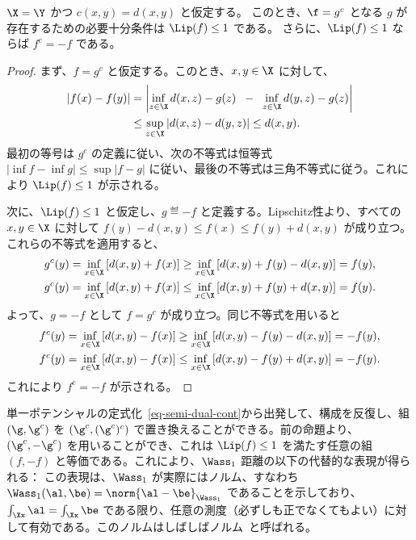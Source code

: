 \begin{prop}$\X=\Y$ かつ $c(x,y)=d(x,y)$ と仮定する。
このとき、$\f = g^c$ となる $g$ が存在するための必要十分条件は $\Lip(f) \leq 1$ である。
さらに、$\Lip(f)\leq1$ ならば $f^c=-f$ である。
\end{prop}

\begin{proof}
まず、$f=g^c$ と仮定する。このとき、$x,y\in \X$ に対して、
\begin{align*}
|f(x)-f(y)|&=\left|\inf_{z\in\X} d(x,z)-g(z) \;\; - \;\;\inf_{z\in \X} d(y,z)-g(z) \right|\\
&\leq \sup_{z\in\X} |d(x,z)-d(y,z)|\leq d(x,y).
\end{align*}
最初の等号は $g^c$ の定義に従い、次の不等式は恒等式 $|\inf f-\inf g|\leq\sup|f-g|$ に従い、最後の不等式は三角不等式に従う。これにより $\Lip(f)\leq1$ が示される。

次に、$\Lip(f)\leq1$ と仮定し、$g\eqdef -f$ と定義する。Lipschitz性より、すべての $x,y\in\X$ に対して
$f(y)-d(x,y)\leq f(x)\leq f(y)+d(x,y)$ が成り立つ。
これらの不等式を適用すると、
\begin{align*}
g^c(y)&=\inf_{x\in\X}\left[ d(x,y) + f(x) \right]
\geq\inf_{x\in \X} \left[  d(x,y)+f(y)-d(x,y)\right]=f(y),\\
g^c(y)&=\inf_{x\in\X}\left[ d(x,y) + f(x) \right]
\leq \inf_{x\in\X}\left[ d(x,y) + f(y)+d(x,y) \right]=f(y).
\end{align*}
よって、$g=-f$ として $f=g^c$ が成り立つ。同じ不等式を用いると
\begin{align*}
f^c(y)&=\inf_{x\in\X}\left[ d(x,y) - f(x) \right]
\geq\inf_{x\in \X} \left[  d(x,y)-f(y)-d(x,y)\right]=-f(y),\\
f^c(y)&=\inf_{x\in\X}\left[ d(x,y) - f(x) \right]
\leq \inf_{x\in\X}\left[ d(x,y) - f(y)+d(x,y) \right]=-f(y).
\end{align*}
これにより $f^c=-f$ が示される。
\end{proof}

単一ポテンシャルの定式化~\eqref{eq-semi-dual-cont}から出発して、構成を反復し、組 $(\g,\g^c)$ を $(\g^c,(\g^c)^c)$ で置き換えることができる。前の命題より、$(\g^c,-\g^c)$ を用いることができ、これは $\Lip(f) \leq 1$ を満たす任意の組 $(f,-f)$ と等価である。これにより、$\Wass_1$ 距離の以下の代替的な表現が得られる：
この表現は、$\Wass_1$ が実際にはノルム、すなわち $\Wass_1(\al,\be) = \norm{\al-\be}_{\Wass_1}$ であることを示しており、$\int_{\Xx} \al=\int_{\Xx} \be$ である限り、任意の測度（必ずしも正でなくてもよい）に対して有効である。このノルムはしばしば\citeauthor{kantorovich1958space}ノルム~\citeyearpar{kantorovich1958space}と呼ばれる。

